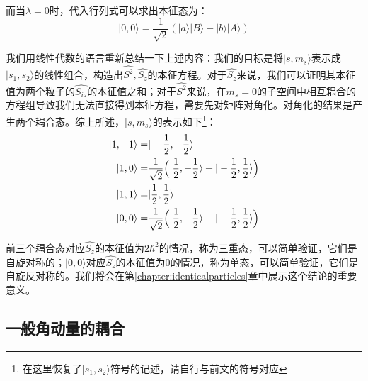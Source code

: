而当$\lambda=0$时，代入行列式可以求出本征态为：
\begin{equation}
    |0,0\rangle=\frac{1}{\sqrt{2}}(|a\rangle|B\rangle-|b\rangle|A\rangle)
\end{equation}

我们用线性代数的语言重新总结一下上述内容：我们的目标是将$|s,m_s\rangle$表示成$|s_1,s_2\rangle$的线性组合，构造出$\hat{S^2},\hat{S_z}$的本征方程。对于$\hat{S_z}$来说，我们可以证明其本征值为两个粒子的$\hat{S_{iz}}$的本征值之和；对于$\hat{S^2}$来说，在$m_s=0$的子空间中相互耦合的方程组导致我们无法直接得到本征方程，需要先对矩阵对角化。对角化的结果是产生两个耦合态。综上所述，$|s,m_s\rangle$的表示如下\footnote{在这里恢复了$|s_1,s_2\rangle$符号的记述，请自行与前文的符号对应}：
\begin{align}
    \begin{split}
        |1,-1\rangle=&|-\frac{1}{2},-\frac{1}{2}\rangle\\
        |1,0\rangle=&\frac{1}{\sqrt{2}}\Bigl(|\frac{1}{2},-\frac{1}{2}\rangle+|-\frac{1}{2},\frac{1}{2}\rangle\Bigr)\\
        |1,1\rangle=&|\frac{1}{2},\frac{1}{2}\rangle\\
        |0,0\rangle=&\frac{1}{\sqrt{2}}\Bigl(|\frac{1}{2},-\frac{1}{2}\rangle-|-\frac{1}{2},\frac{1}{2}\rangle\Bigr)
    \end{split}
\end{align}

前三个耦合态对应$\hat{S_z}\textrm{的本征值为}2\hbar^2$的情况，称为三重态，可以简单验证，它们是自旋对称的；$|0,0\rangle$对应$\hat{S_z}\textrm{的本征值为}0$的情况，称为单态，可以简单验证，它们是自旋反对称的。我们将会在第\ref{chapter:identicalparticles}章中展示这个结论的重要意义。
    \subsection{一般角动量的耦合}
